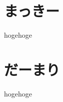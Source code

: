 \documentclass[9pt,b5paper,tombo]{jsbook}
\begin{document}
\section{まっきー}

hogehoge

\section{だーまり}

hogehoge

\newpage


\enlargethispage{\paperwidth}
\thispagestyle{empty}
\vspace*{-1truein}
\vspace*{-\topmargin}
\vspace*{-\headheight}
\vspace*{-\headsep}
\vspace*{-\topskip}
\noindent\hspace*{-1in}\hspace*{-\oddsidemargin}
\end{document}
